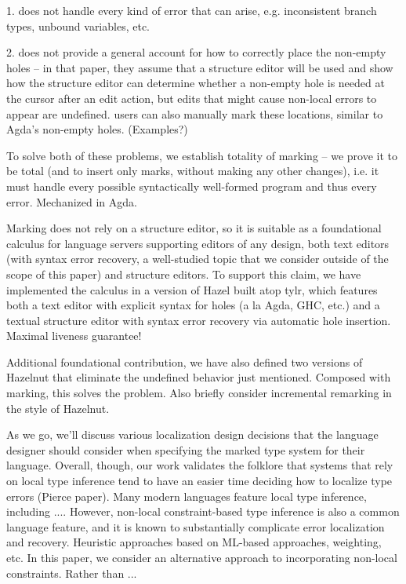1. does not handle every kind of error that can arise, e.g. inconsistent branch types, unbound variables, etc.

2. does not provide a general account for how to correctly place the non-empty holes -- in that paper, they assume that a structure editor will be used and show how the structure editor can determine whether a non-empty hole is needed at the cursor after an edit action, but edits that might cause non-local errors to appear are undefined. users can also manually mark these locations, similar to Agda's non-empty holes. (Examples?)

To solve both of these problems, we establish totality of marking -- we prove it to be total (and to insert only marks, without making any other changes), i.e. it must handle 
every possible syntactically well-formed program and thus every error. Mechanized in Agda.

Marking does not rely on a structure editor, so it is suitable as a foundational calculus for language servers supporting editors of any 
design, both text editors (with syntax error recovery, a well-studied topic that we consider outside of the scope of this paper) and structure editors. To support this claim, we have implemented the calculus in a version of Hazel built atop tylr, which features both a text editor with explicit syntax for holes (a la Agda, GHC, etc.) and a textual structure editor with syntax error recovery via automatic hole insertion. Maximal liveness guarantee! 

Additional foundational contribution, we have also defined two versions of Hazelnut that eliminate the undefined behavior just mentioned. Composed with marking, this solves the problem. Also briefly consider incremental remarking in the style of Hazelnut.

As we go, we'll discuss various localization design decisions that the language designer should consider when specifying the marked type system for their language. Overall, though, our work validates the folklore that systems that rely on local type inference tend to have an easier time deciding how to localize type errors (Pierce paper). Many modern languages feature local type inference, including .... 
However, non-local constraint-based type inference is also a common language feature, and it is known to substantially complicate error localization and recovery. 
Heuristic approaches based on ML-based approaches, weighting, etc.
In this paper, we consider an alternative approach to incorporating non-local constraints. Rather than ...

